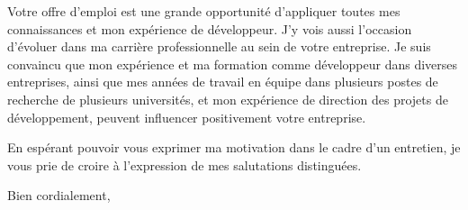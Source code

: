 \documentclass[11pt,a4paper]{letter} %
\begin{document}
\begin{letter}

Votre offre d'emploi est une grande opportunité d'appliquer toutes mes connaissances et mon expérience de développeur. J'y vois aussi l'occasion d'évoluer dans ma carrière professionnelle au sein de votre entreprise. Je suis convaincu que mon expérience et ma formation comme développeur dans diverses entreprises, ainsi que mes années de travail en équipe dans plusieurs postes de recherche de plusieurs universités, et mon expérience de direction des projets de développement, peuvent influencer positivement votre entreprise. 



En espérant pouvoir vous exprimer ma motivation dans le cadre d'un entretien, je vous prie de croire %
à l'expression de mes salutations distinguées.

\closing{Bien cordialement,}


\end{letter}
\end{document}
